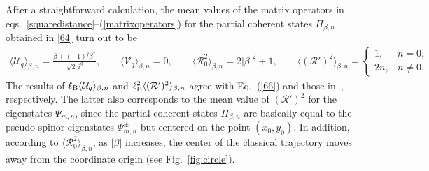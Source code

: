 \documentclass[aps,showpacs,showkeys]{revtex4}
\begin{document}
After a straightforward calculation, the mean values of the matrix operators in 
eqs.~\eqref{squaredistance}--(\ref{matrixoperators}) for the partial coherent states $\Pi_{\beta,n}$ obtained in \eqref{64} turn out to be
	\begin{eqnarray}
		\langle\mathcal{U}_{q}\rangle_{\beta,n}=\frac{\beta+(-1)^{q}\beta^{\ast}}{\sqrt{2}\, i^{q}}, \qquad \langle\mathcal{V}_{q}\rangle_{\beta,n}=0, \qquad
		\langle\mathcal{R}_{0}^{2}\rangle_{\beta,n}=2\vert\beta\vert^{2}+1, \qquad 
		\langle(\mathcal{R}')^{2}\rangle_{\beta,n}=\begin{cases}
			1, & n=0, \\
		2n, & n\neq0.
		\end{cases}
	\end{eqnarray}
The results of $\ell_{\rm B}\langle\mathcal{U}_{q}\rangle_{\beta,n}$ and 
$\ell_{\rm B}^{2} \langle(\mathcal{R}')^{2}\rangle_{\beta,n}$ agree with Eq.~(\ref{66}) and those in~\cite{diaz20}, respectively. The latter also corresponds to the mean value of $(\mathcal{R}')^{2}$ for the eigenstates $\Psi_{m,n}^{\pm}$, since the partial coherent states $\Pi_{\beta,n}$ are basically equal to the pseudo-spinor eigenstates $\Psi_{m,n}^{\pm}$ but centered on the point $(x_{0},y_{0})$. In addition, according to $\langle\mathcal{R}_{0}^{2}\rangle_{\beta,n}$, as $\vert\beta\vert$ increases, the center of the classical trajectory moves away from the coordinate origin (see Fig.~\ref{fig:circle}).
\end{document}
